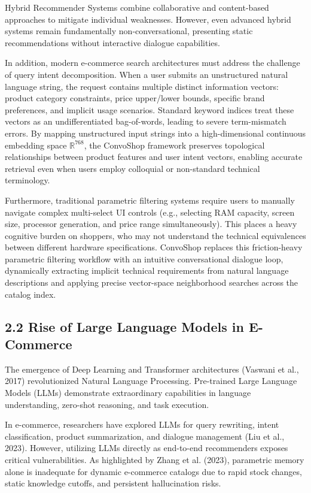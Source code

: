 \documentclass[12pt,a4paper]{article}
\begin{document}
Hybrid Recommender Systems combine collaborative and content-based approaches to mitigate individual weaknesses. However, even advanced hybrid systems remain fundamentally non-conversational, presenting static recommendations without interactive dialogue capabilities.



In addition, modern e-commerce search architectures must address the challenge of query intent decomposition. When a user submits an unstructured natural language string, the request contains multiple distinct information vectors: product category constraints, price upper/lower bounds, specific brand preferences, and implicit usage scenarios. Standard keyword indices treat these vectors as an undifferentiated bag-of-words, leading to severe term-mismatch errors. By mapping unstructured input strings into a high-dimensional continuous embedding space $\mathbb{R}^{768}$, the ConvoShop framework preserves topological relationships between product features and user intent vectors, enabling accurate retrieval even when users employ colloquial or non-standard technical terminology.

Furthermore, traditional parametric filtering systems require users to manually navigate complex multi-select UI controls (e.g., selecting RAM capacity, screen size, processor generation, and price range simultaneously). This places a heavy cognitive burden on shoppers, who may not understand the technical equivalences between different hardware specifications. ConvoShop replaces this friction-heavy parametric filtering workflow with an intuitive conversational dialogue loop, dynamically extracting implicit technical requirements from natural language descriptions and applying precise vector-space neighborhood searches across the catalog index.

\subsection*{2.2 Rise of Large Language Models in E-Commerce}
\label{sec:2.2}
The emergence of Deep Learning and Transformer architectures (Vaswani et al., 2017) revolutionized Natural Language Processing. Pre-trained Large Language Models (LLMs) demonstrate extraordinary capabilities in language understanding, zero-shot reasoning, and task execution.

In e-commerce, researchers have explored LLMs for query rewriting, intent classification, product summarization, and dialogue management (Liu et al., 2023). However, utilizing LLMs directly as end-to-end recommenders exposes critical vulnerabilities. As highlighted by Zhang et al. (2023), parametric memory alone is inadequate for dynamic e-commerce catalogs due to rapid stock changes, static knowledge cutoffs, and persistent hallucination risks.
\end{document}

